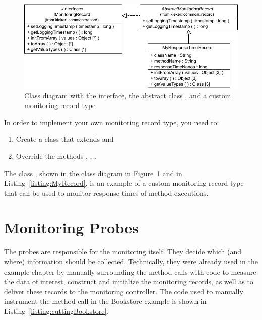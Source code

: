 \begin{figure}[h]\centering
\includegraphics[scale=0.7]{images/kieker_MyRTRecord-modified}
\caption{Class diagram with the  interface, the abstract %
class , and a custom monitoring record type %
}
\label{sec:monitoringrecord:interfacesAndImplementingClasses}
\end{figure}

\noindent In order to implement your own monitoring record type, you need to:

\begin{enumerate}
\item Create a class that extends   and
\item Override the methods , , .
\end{enumerate}

\noindent The class , shown in the class diagram in %
Figure~\ref{sec:monitoringrecord:interfacesAndImplementingClasses} and in %
Listing~\ref{listing:MyRecord}, is an example of a custom monitoring record type %
that can be used to monitor response times of method executions.

\setJavaCodeListing



\section{Monitoring Probes}\label{sec:monitoring:probe}

The probes are responsible for the monitoring itself. They decide which (and where) information should be collected. Technically, they were already used in the example chapter by manually surrounding the method calls with code to measure the data of interest, %
construct and initialize the monitoring records, as well as to deliver these records to the monitoring controller. %
The code used to manually instrument the method call in the Bookstore example is %
shown in Listing~\ref{listing:cuttingBookstore}. %

